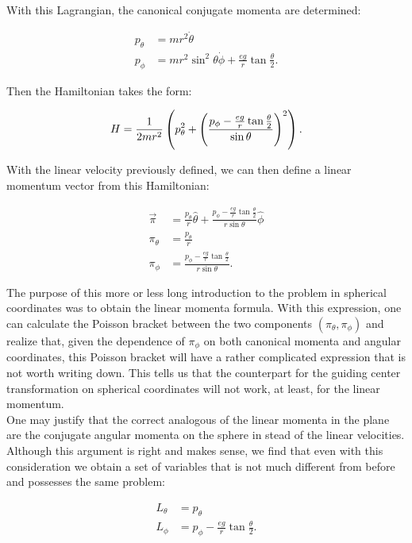 With this Lagrangian, the canonical conjugate momenta are determined:

\begin{align*}
p_\theta &= mr^2\dot{\theta}\\
p_\phi &= mr^2\sin^2\theta\dot{\phi} + \frac{eg}{r}\tan{\frac{\theta}{2}}.
\end{align*}

Then the Hamiltonian takes the form:

\begin{equation}
H = \frac{1}{2mr^2}\left( p_\theta^2 + \left( \frac{p_\phi - \frac{eg}{r}\tan{\frac{\theta}{2}}}{\sin\theta} \right)^2 \right).
\end{equation}

With the linear velocity previously defined, we can then define a linear momentum vector from this Hamiltonian:

\begin{align*}
\vec{\pi} &= \frac{p_\theta}{r}\hat{\theta} + \frac{p_\phi - \frac{eg}{r}\tan{\frac{\theta}{2}}}{r\sin\theta}\hat{\phi}\\
\pi_\theta &= \frac{p_\theta}{r}\\
\pi_\phi &= \frac{p_\phi - \frac{eg}{r}\tan{\frac{\theta}{2}}}{r\sin\theta}.
\end{align*}

The purpose of this more or less long introduction to the problem in spherical coordinates was to obtain the linear momenta formula. With this expression, one can calculate the Poisson bracket between the two components $(\pi_\theta,\pi_\phi)$ and realize that, given the dependence of $\pi_\phi$ on both canonical momenta and angular coordinates, this Poisson bracket will have a rather complicated expression that is not worth writing down. This tells us that the counterpart for the guiding center transformation on spherical coordinates will not work, at least, for the linear momentum.\\

One may justify that the correct analogous of the linear momenta in the plane are the conjugate angular momenta on the sphere in stead of the linear velocities. Although this argument is right and makes sense, we find that even with this consideration we obtain a set of variables that is not much different from before and possesses the same problem:

\begin{align*}
L_\theta &= p_\theta\\
L_\phi &= p_\phi - \frac{eg}{r}\tan{\frac{\theta}{2}}.
\end{align*}

